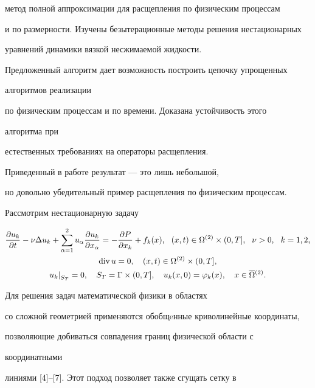 метод полной аппроксимации для расщепления по физическим процессам


и по размерности. Изучены безытерационные методы решения нестационарных


уравнений динамики вязкой несжимаемой жидкости.


Предложенный алгоритм дает возможность построить цепочку упрощенных


алгоритмов реализации


по физическим процессам и по времени. Доказана устойчивость этого


алгоритма при


естественных требованиях на операторы расщепления.


Приведенный в работе результат --- это лишь небольшой,


но довольно убедительный пример расщепления по физическим процессам.





Рассмотрим нестационарную задачу


\begin{gather}


\frac{\partial u_k}{\partial t}- \nu\Delta u_k+


\sum_{\alpha=1}^2u_\alpha\frac{\partial u_k}{\partial


x_\alpha}=-\frac{\partial P}{\partial x_k}+f_k(x),\ \ (x,t)\in\Omega^{(2)}


\times (0,T],\ \ \nu>0,\ \ k=1,2,\\


%


\Div u=0,\quad (x,t)\in \Omega^{(2)}\times (0,T],\\




%


u_k|_{S_T}^{~}=0,\quad S_T=\Gamma\times (0,T],\quad


u_k(x,0)=\varphi_k(x),\quad x\in {\overline\Omega}{}^{(2)}.


\end{gather}


Для решения задач математической физики в областях


со сложной геометрией применяются обобщeнные криволинейные координаты,


позволяющие добиваться совпадения границ физической области с


координатными


линиями [4]--[7]. Этот подход позволяет также сгущать сетку в


